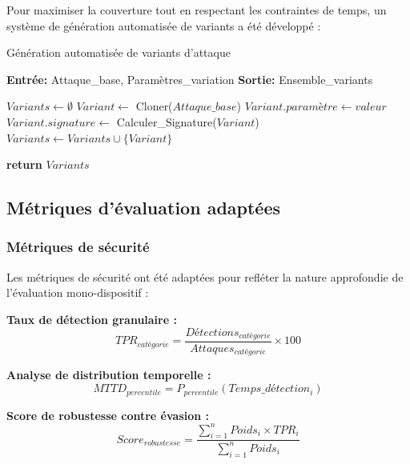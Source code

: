 Pour maximiser la couverture tout en respectant les contraintes de temps, un système de génération automatisée de variants a été développé :

\begin{algorithm}
\caption{Génération automatisée de variants d'attaque}
\label{alg:attack-variant-generation}
\begin{algorithmic}[1]
\State \textbf{Entrée:} Attaque\_base, Paramètres\_variation
\State \textbf{Sortie:} Ensemble\_variants

\State $Variants \leftarrow \emptyset$
        \State $Variant \leftarrow$ Cloner($Attaque\_base$)
        \State $Variant.paramètre \leftarrow valeur$
        \State $Variant.signature \leftarrow$ Calculer\_Signature($Variant$)
        \State $Variants \leftarrow Variants \cup \{Variant\}$
    \EndFor
\EndFor

\State \textbf{return} $Variants$
\end{algorithmic}
\end{algorithm}

\subsection{Métriques d'évaluation adaptées}

\subsubsection{Métriques de sécurité}

Les métriques de sécurité ont été adaptées pour refléter la nature approfondie de l'évaluation mono-dispositif :

\textbf{Taux de détection granulaire :}
\begin{equation}
TPR_{catégorie} = \frac{Détections_{catégorie}}{Attaques_{catégorie}} \times 100
\end{equation}

\textbf{Analyse de distribution temporelle :}
\begin{equation}
MTTD_{percentile} = P_{percentile}(Temps\_détection_i)
\end{equation}

\textbf{Score de robustesse contre évasion :}
\begin{equation}
Score_{robustesse} = \frac{\sum_{i=1}^{n} Poids_i \times TPR_i}{\sum_{i=1}^{n} Poids_i}
\end{equation}

